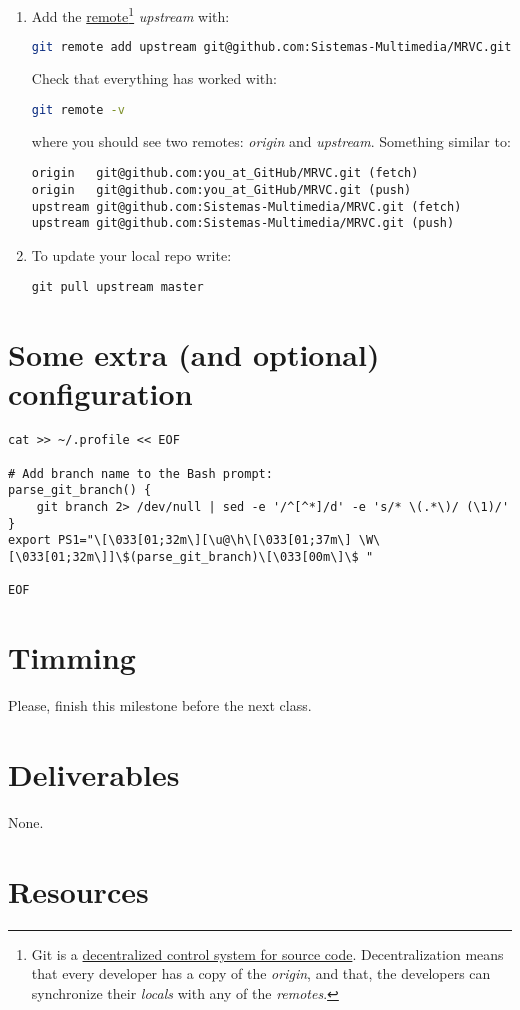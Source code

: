 \begin{enumerate}
\item Add the
  \href{https://docs.github.com/en/github/getting-started-with-github/github-glossary#remote}{remote}\footnote{Git
  is a
  \href{https://nvie.com/posts/a-successful-git-branching-model/}{decentralized
    control system for source code}. Decentralization means that every
  developer has a copy of the \emph{origin}, and that, the developers
  can synchronize their \emph{locals} with any of the \emph{remotes}.}
  \emph{upstream} with:

  \begin{lstlisting}[language=bash]
    git remote add upstream git@github.com:Sistemas-Multimedia/MRVC.git
  \end{lstlisting}

  Check that everything has worked with:

  \begin{lstlisting}[language=bash]  
    git remote -v
  \end{lstlisting}

  where you should see two remotes: \emph{origin} and \emph{upstream}. Something similar to:

\begin{verbatim}
origin   git@github.com:you_at_GitHub/MRVC.git (fetch)
origin   git@github.com:you_at_GitHub/MRVC.git (push)
upstream git@github.com:Sistemas-Multimedia/MRVC.git (fetch)
upstream git@github.com:Sistemas-Multimedia/MRVC.git (push)
\end{verbatim}

\item To update your local repo write:

\begin{verbatim}
git pull upstream master
\end{verbatim}

\end{enumerate}

\section{Some extra (and optional) configuration}

\begin{verbatim}
cat >> ~/.profile << EOF

# Add branch name to the Bash prompt:
parse_git_branch() {
    git branch 2> /dev/null | sed -e '/^[^*]/d' -e 's/* \(.*\)/ (\1)/'
}
export PS1="\[\033[01;32m\][\u@\h\[\033[01;37m\] \W\[\033[01;32m\]]\$(parse_git_branch)\[\033[00m\]\$ "

EOF
\end{verbatim}

\section{Timming}

Please, finish this milestone before the next class.

\section{Deliverables}

None.

\section{Resources}

\renewcommand{\addcontentsline}[3]{}%

